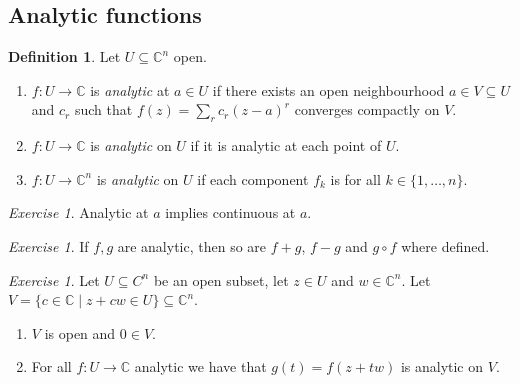 \documentclass[11pt,A4]{article}
\theoremstyle{plain}
\theoremstyle{definition}
\newtheorem{defn}[thm]{Definition}
\theoremstyle{remark}
\newtheorem{exe}[thm]{Exercise}
\newcommand{\1}{\mathbbm{1}}
\newcommand{\C}{\mathbb{C}}
\begin{document}
\subsection{Analytic functions}

\begin{defn}
    Let $U\subseteq \C^{n}$ open.
    \begin{enumerate}[label=\roman*)]
	\item $f\colon U\to \C$ is \textit{analytic} at $a\in U$ if there exists an open neighbourhood $a\in V\subseteq U$ and $c_{r}$ such that $f(z)=\sum_{r}c_{r}(z-a)^{r}$ converges compactly on $V$.
	\item $f\colon U\to \C$ is \textit{analytic} on $U$ if it is analytic at each point of $U$.
	\item $f\colon U\to \C^{n}$ is \textit{analytic} on $U$ if each component $f_{k}$ is for all $k\in \{1,\ldots, n\}$.
    \end{enumerate}
\end{defn}

\begin{exe}
    Analytic at $a$ implies continuous at $a$.
\end{exe}

\begin{exe}
    If $f,g$ are analytic, then so are $f+g$, $f-g$ and $g\circ f$ where defined.
\end{exe}

\begin{exe}
    Let $U\subseteq C^{n}$ be an open subset, let $z\in U$ and $w\in \C^{n}$.
    Let $V=\{c\in \C\mid z+cw\in U\}\subseteq \C^{n}$.
    \begin{enumerate}[label=\roman*)]
	\item $V$ is open and $0\in V$.
	\item For all $f\colon U\to \C$ analytic we have that $g(t)=f(z+tw)$ is analytic on $V$.
    \end{enumerate}
\end{exe}
\end{document}
